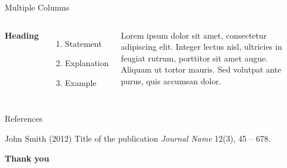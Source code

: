 \documentclass[aspectratio=169,xcolor=dvipsnames]{beamer}
\begin{document}
\begin{frame}{Multiple Columns}
    \begin{columns}[c] %

        \textbf{Heading}
        \begin{enumerate}
            \item Statement
            \item Explanation
            \item Example
        \end{enumerate}

        Lorem ipsum dolor sit amet, consectetur adipiscing elit. Integer lectus nisl, ultricies in feugiat rutrum, porttitor sit amet augue. Aliquam ut tortor mauris. Sed volutpat ante purus, quis accumsan dolor.

    \end{columns}
\end{frame}


\begin{frame}{References}
    \footnotesize{
        \begin{thebibliography}{99}
             John Smith (2012)
            \newblock Title of the publication
            \newblock \emph{Journal Name} 12(3), 45 -- 678.
        \end{thebibliography}
    }
\end{frame}


\begin{frame}
    \Huge{\centerline{\textbf{Thank you}}}
\end{frame}

\end{document}
